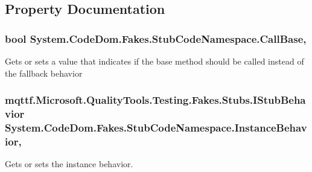 \subsection{Property Documentation}
\hypertarget{class_system_1_1_code_dom_1_1_fakes_1_1_stub_code_namespace_aa88340ba2642fd78a176e430f6148b10}{
\subsubsection[{Call\-Base}]{\setlength{\rightskip}{0pt plus 5cm}bool System.\-Code\-Dom.\-Fakes.\-Stub\-Code\-Namespace.\-Call\-Base\hspace{0.3cm}{\ttfamily [get]}, {\ttfamily [set]}}}\label{class_system_1_1_code_dom_1_1_fakes_1_1_stub_code_namespace_aa88340ba2642fd78a176e430f6148b10}


Gets or sets a value that indicates if the base method should be called instead of the fallback behavior

\hypertarget{class_system_1_1_code_dom_1_1_fakes_1_1_stub_code_namespace_adc35d64cc86730455944ed8f8a50e48a}{
\subsubsection[{Instance\-Behavior}]{\setlength{\rightskip}{0pt plus 5cm}mqttf.\-Microsoft.\-Quality\-Tools.\-Testing.\-Fakes.\-Stubs.\-I\-Stub\-Behavior System.\-Code\-Dom.\-Fakes.\-Stub\-Code\-Namespace.\-Instance\-Behavior\hspace{0.3cm}{\ttfamily [get]}, {\ttfamily [set]}}}\label{class_system_1_1_code_dom_1_1_fakes_1_1_stub_code_namespace_adc35d64cc86730455944ed8f8a50e48a}


Gets or sets the instance behavior.

